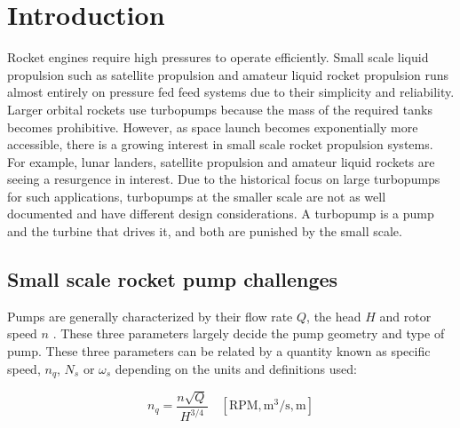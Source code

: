 \section{Introduction}

Rocket engines require high pressures to operate efficiently. Small scale liquid propulsion such as satellite propulsion and amateur liquid rocket propulsion runs almost entirely on pressure fed feed systems due to their simplicity and reliability. Larger orbital rockets use turbopumps because the mass of the required tanks becomes prohibitive. However, as space launch becomes exponentially more accessible, there is a growing interest in small scale rocket propulsion systems. For example, lunar landers, satellite propulsion and amateur liquid rockets are seeing a resurgence in interest. Due to the historical focus on large turbopumps for such applications, turbopumps at the smaller scale are not as well documented and have different design considerations. A turbopump is a pump and the turbine that drives it, and both are punished by the small scale.

\subsection{Small scale rocket pump challenges}


Pumps are generally characterized by their flow rate $Q$, the head $H$ and rotor speed $n$ \cite{gulichCentrifugalPumps2020}. These three parameters largely decide the pump geometry and type of pump. These three parameters can be related by a quantity known as specific speed, $n_q$, $N_s$ or $\omega_s$ depending on the units and definitions used:

\begin{equation}
    n_q = \frac{n \sqrt{Q}}{H^{3/4}} \quad [\text{RPM}, \text{m}^3/\text{s}, \text{m}] \label{eq:specific_speed}
\end{equation}


